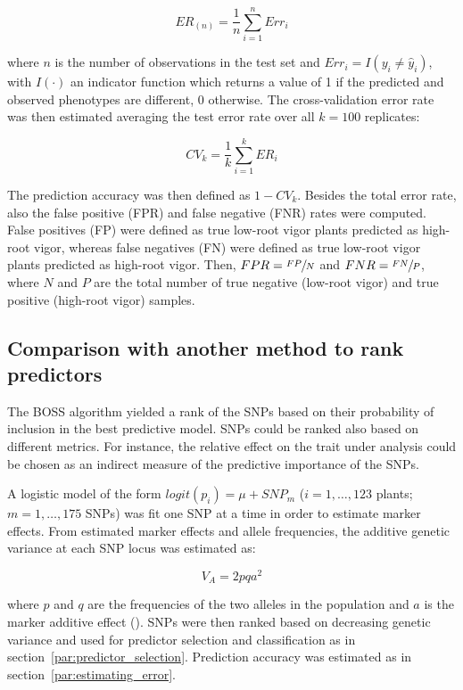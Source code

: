 \begin{equation} \label{eq:testerr}
 ER_{(n)}=\frac{1}{n} \sum_{i=1}^{n} Err_i
\end{equation}

where $n$ is the number of observations in the test set and $Err_i=I(y_i \neq \hat{y}_i)$, with $I(\cdot)$ an indicator function
which returns a value of 1 if the predicted and observed phenotypes are
different, 0 otherwise. 
The cross-validation error rate was then estimated averaging the test error
rate over all $k=100$ replicates:

\begin{equation} \label{eq:cverr}
CV_{k}=\frac{1}{k} \sum_{i=1}^k ER_i
\end{equation}

The prediction accuracy was then defined as $1-CV_k$. Besides the total
error rate, also the false positive (FPR) and false negative (FNR) rates
were computed. False positives (FP) were defined as true low-root vigor
plants predicted as high-root vigor, whereas false negatives (FN) were
defined as true low-root vigor plants predicted as high-root vigor.
Then, $FPR=\sfrac{FP}{N}$ and $FNR=\sfrac{FN}{P}$, where $N$ and $P$ are
the total number of true negative (low-root vigor) and true positive
(high-root vigor) samples.

\subsection{Comparison with another method to rank predictors}
\label{sec:other_ranker}
The BOSS algorithm yielded a rank of the SNPs based on their probability
of inclusion in the best predictive model. SNPs could be ranked also
based on different metrics. For instance, the relative effect on the
trait under analysis could be chosen as an indirect measure of the
predictive importance of the SNPs.

A logistic model of the form $logit(p_i)=\mu+SNP_m$ ($i=1,\ldots,123$
plants; $m=1,\ldots, 175$ SNPs) was fit one SNP
at a time in order to estimate marker effects.
From estimated marker effects and allele frequencies, the additive
genetic variance at each SNP locus was estimated as:

\begin{equation}
V_A=2pqa^2
\end{equation}

where $p$ and $q$ are the frequencies of the two alleles in the
population and $a$ is the marker additive effect
(\cite{gianola2009additive}).
SNPs were then ranked based on decreasing genetic variance and used for
predictor selection and classification as in
section~\ref{par:predictor_selection}. Prediction accuracy was estimated
as in section~\ref{par:estimating_error}.

